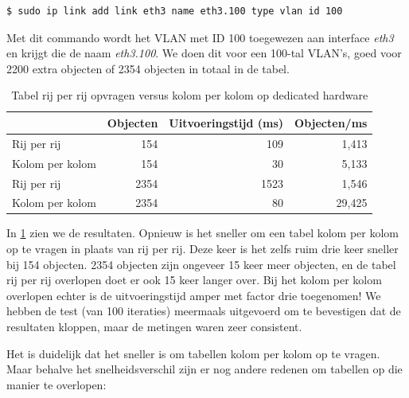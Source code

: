 \begin{lstlisting}[caption={Aanmaken van een VLAN}, label=commando-vlan]
$ sudo ip link add link eth3 name eth3.100 type vlan id 100
\end{lstlisting}

Met dit commando wordt het VLAN met ID 100 toegewezen aan interface \textit{eth3} en krijgt die de naam \textit{eth3.100}.
We doen dit voor een 100-tal VLAN's, goed voor 2200 extra objecten of 2354 objecten in totaal in de tabel.

\begin{table}[h]
\centering
\begin{tabular}{@{}lrrr@{}}
\toprule
                & Objecten & Uitvoeringstijd (ms) & Objecten/ms \\ \midrule
Rij per rij     & 154      & 109                  & 1,413       \\
Kolom per kolom & 154      & 30                   & 5,133       \\
Rij per rij     & 2354     & 1523                 & 1,546       \\
Kolom per kolom & 2354     & 80                   & 29,425      \\ \bottomrule
\end{tabular}
\caption{Tabel rij per rij opvragen versus kolom per kolom op dedicated hardware}
\label{tabel-serieel-vs-parallel-vwall}
\end{table}

In \cref{tabel-serieel-vs-parallel-vwall} zien we de resultaten.
Opnieuw is het sneller om een tabel kolom per kolom op te vragen in plaats van rij per rij.
Deze keer is het zelfs ruim drie keer sneller bij 154 objecten.
2354 objecten zijn ongeveer 15 keer meer objecten, en de tabel rij per rij overlopen doet er ook 15 keer langer over.
Bij het kolom per kolom overlopen echter is de uitvoeringstijd amper met factor drie toegenomen!
We hebben de test (van 100 iteraties) meermaals uitgevoerd om  te bevestigen dat de resultaten kloppen,
maar de metingen waren zeer consistent.


Het is duidelijk dat het sneller is om tabellen kolom per kolom op te vragen.
Maar behalve het snelheidsverschil zijn er nog andere redenen om tabellen op die manier te overlopen:

